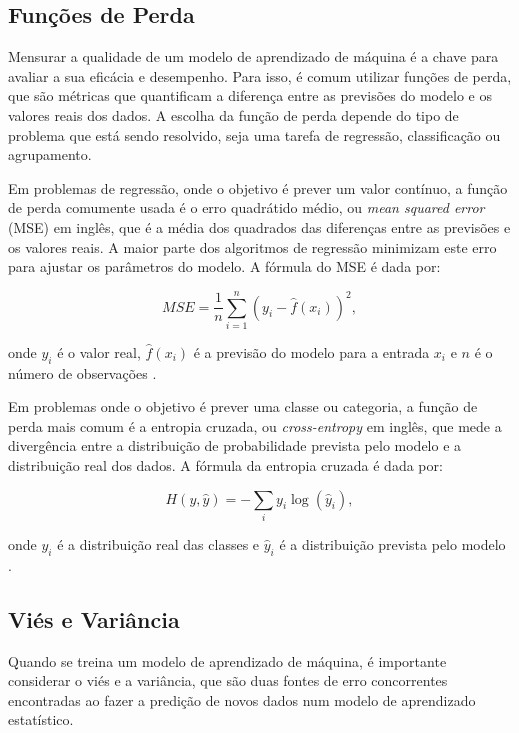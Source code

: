 \subsection{Funções de Perda}

Mensurar a qualidade de um modelo de aprendizado de máquina é a chave para avaliar a sua eficácia e desempenho. Para isso, é comum utilizar funções de perda, que são métricas que quantificam a diferença entre as previsões do modelo e os valores reais dos dados. A escolha da função de perda depende do tipo de problema que está sendo resolvido, seja uma tarefa de regressão, classificação ou agrupamento.

Em problemas de regressão, onde o objetivo é prever um valor contínuo, a função de perda comumente usada é o erro quadrátido médio, ou \textit{mean squared error} (MSE) em inglês, que é a média dos quadrados das diferenças entre as previsões e os valores reais. A maior parte dos algoritmos de regressão minimizam este erro para ajustar os parâmetros do modelo. A fórmula do MSE é dada por:

\begin{equation}
    MSE = \frac{1}{n} \sum_{i=1}^{n} (y_i - \hat{f}(x_i))^2,
\end{equation}

onde $y_i$ é o valor real, $\hat{f}(x_i)$ é a previsão do modelo para a entrada $x_i$ e $n$ é o número de observações \citep{James2000}.

Em problemas onde o objetivo é prever uma classe ou categoria, a função de perda mais comum é a entropia cruzada, ou \textit{cross-entropy} em inglês, que mede a divergência entre a distribuição de probabilidade prevista pelo modelo e a distribuição real dos dados. A fórmula da entropia cruzada é dada por:

\begin{equation}
    H(y, \hat{y}) = -\sum_{i} y_i \log(\hat{y}_i),
\end{equation}

onde $y_i$ é a distribuição real das classes e $\hat{y}_i$ é a distribuição prevista pelo modelo \citep{Hastie2019}.

\subsection{Viés e Variância}

Quando se treina um modelo de aprendizado de máquina, é importante considerar o viés e a variância, que são duas fontes de erro concorrentes encontradas ao fazer a predição de novos dados num modelo de aprendizado estatístico.

